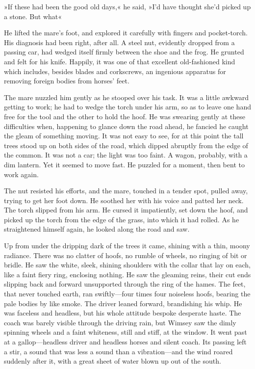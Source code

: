 »If these had been the good old days,« he said, »I'd have thought she'd picked up a stone. But what\longdash«

He lifted the mare's foot, and explored it carefully with fingers and pocket-torch. His diagnosis had been right, after all. A steel nut, evidently dropped from a passing car, had wedged itself firmly between the shoe and the frog. He grunted and felt for his knife. Happily, it was one of that excellent old-fashioned kind which includes, besides blades and corkscrews, an ingenious apparatus for removing foreign bodies from horses' feet.

The mare nuzzled him gently as he stooped over his task. It was a little awkward getting to work; he had to wedge the torch under his arm, so as to leave one hand free for the tool and the other to hold the hoof. He was swearing gently at these difficulties when, happening to glance down the road ahead, he fancied he caught the gleam of something moving. It was not easy to see, for at this point the tall trees stood up on both sides of the road, which dipped abruptly from the edge of the common. It was not a car; the light was too faint. A wagon, probably, with a dim lantern. Yet it seemed to move fast. He puzzled for a moment, then bent to work again.

The nut resisted his efforts, and the mare, touched in a tender spot, pulled away, trying to get her foot down. He soothed her with his voice and patted her neck. The torch slipped from his arm. He cursed it impatiently, set down the hoof, and picked up the torch from the edge of the grass, into which it had rolled. As he straightened himself again, he looked along the road and saw.

Up from under the dripping dark of the trees it came, shining with a thin, moony radiance. There was no clatter of hoofs, no rumble of wheels, no ringing of bit or bridle. He saw the white, sleek, shining shoulders with the collar that lay on each, like a faint fiery ring, enclosing nothing. He saw the gleaming reins, their cut ends slipping back and forward unsupported through the ring of the hames. The feet, that never touched earth, ran swiftly—four times four noiseless hoofs, bearing the pale bodies by like smoke. The driver leaned forward, brandishing his whip. He was faceless and headless, but his whole attitude bespoke desperate haste. The coach was barely visible through the driving rain, but Wimsey saw the dimly spinning wheels and a faint whiteness, still and stiff, at the window. It went past at a gallop—headless driver and headless horses and silent coach. Its passing left a stir, a sound that was less a sound than a vibration—and the wind roared suddenly after it, with a great sheet of water blown up out of the south.

